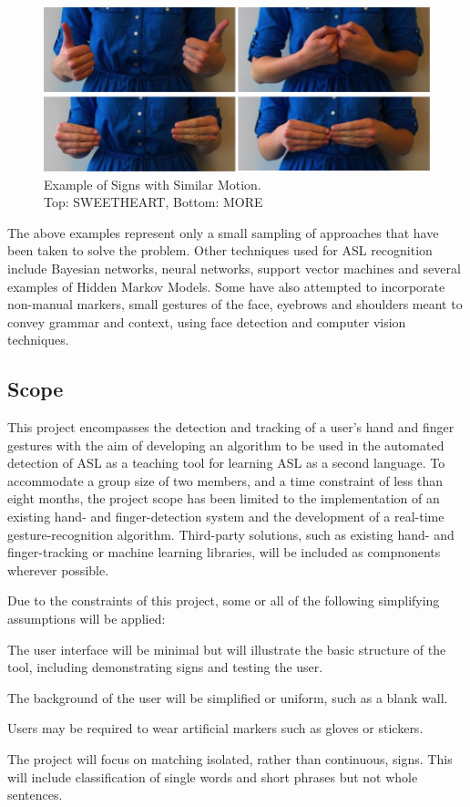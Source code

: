 \documentclass[12pt]{article}
\begin{document}
\begin{figure}[h!]
  \centering
  \includegraphics[scale=1]{MORESWEETHEART.png}
  \caption[Example of Signs with Similar Motion]
  { Example of Signs with Similar Motion.  \\ Top: SWEETHEART, Bottom: MORE  }
  \label{fig:MORE}
\end{figure}

The above examples represent only a small sampling of approaches that have been taken to solve the problem. Other techniques used for ASL recognition include Bayesian networks, \cite{Shira} neural networks, \cite{Oz} support vector machines \cite{Agarwal} and several examples of Hidden Markov Models. \cite{Elmezain}\cite{Moni} Some have also attempted to incorporate non-manual markers, small gestures of the face, eyebrows and shoulders meant to convey grammar and context, using face detection and computer vision techniques. \cite{Liu}

\subsection{Scope}
This project encompasses the detection and tracking of a user's hand and finger gestures with the aim of developing an algorithm to be used in the automated detection of ASL as a teaching tool for learning ASL as a second language. To accommodate a group size of two members, and a time constraint of less than eight months, the project scope has been limited to the implementation of an existing hand- and finger-detection system and the development of a real-time gesture-recognition algorithm. Third-party solutions, such as existing hand- and finger-tracking or machine learning libraries, will be included as compnonents wherever possible. 

Due to the constraints of this project, some or all of the following simplifying assumptions will be applied:

\begin{enumerate*}
  \item The user interface will be minimal but will illustrate the basic structure of the tool, including demonstrating signs and testing the user. 
  \item The background of the user will be simplified or uniform, such as a blank wall. 
  \item Users may be required to wear artificial markers such as gloves or stickers.
  \item The project will focus on matching isolated, rather than continuous, signs. This will include classification of single words and short phrases but not whole sentences. 
\end{enumerate*}
\end{document}
